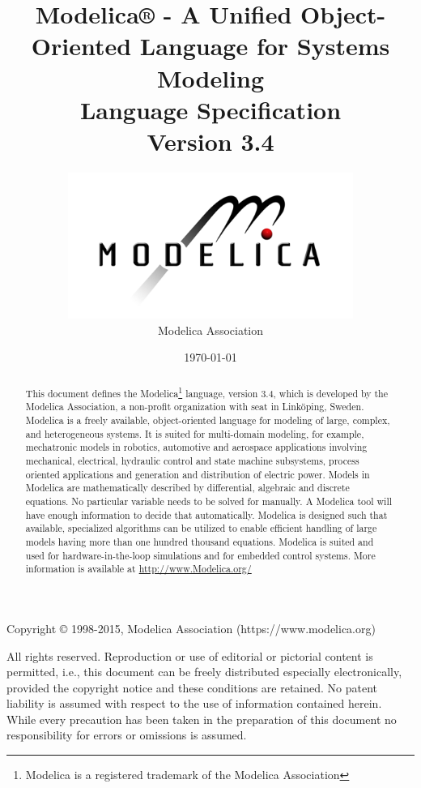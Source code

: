 \documentclass[10pt,a4paper]{report}
\begin{document}
\title{Modelica® - A Unified Object-Oriented Language for Systems Modeling\\[2\baselineskip]Language Specification\\[2\baselineskip]Version 3.4}
\date{\today}
\author{\includegraphics[width=0.7\textwidth,height=0.35\textwidth]{media/image1}\\Modelica Association}
\maketitle
\begin{abstract}
This document defines the Modelica\footnote{Modelica is a registered
  trademark of the Modelica Association} language, version 3.4, which is
developed by the Modelica Association, a non-profit organization with
seat in Linköping, Sweden. Modelica is a freely available,
object-oriented language for modeling of large, complex, and
heterogeneous systems. It is suited for multi-domain modeling, for
example, mechatronic models in robotics, automotive and aerospace
applications involving mechanical, electrical, hydraulic control and
state machine subsystems, process oriented applications and generation
and distribution of electric power. Models in Modelica are
mathematically described by differential, algebraic and discrete
equations. No particular variable needs to be solved for manually. A
Modelica tool will have enough information to decide that automatically.
Modelica is designed such that available, specialized algorithms can be
utilized to enable efficient handling of large models having more than
one hundred thousand equations. Modelica is suited and used for
hardware-in-the-loop simulations and for embedded control systems. More
information is available at
\href{http://www.modelica.org/}{http://www.Modelica.org/}
\end{abstract}

Copyright © 1998-2015, Modelica Association (https://www.modelica.org)

All rights reserved. Reproduction or use of editorial or pictorial
content is permitted, i.e., this document can be freely distributed
especially electronically, provided the copyright notice and these
conditions are retained. No patent liability is assumed with respect to
the use of information contained herein. While every precaution has been
taken in the preparation of this document no responsibility for errors
or omissions is assumed.
\end{document}
